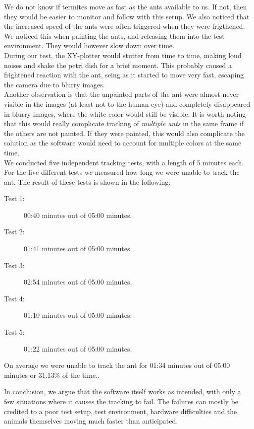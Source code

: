 We do not know if termites move as fast as the ants available to us. If not, then they would be easier to monitor and follow with this setup. We also noticed that the increased speed of the ants were often triggered when they were frigthened. We noticed this when painting the ants, and releasing them into the test environment. They would however slow down over time. \\

During our test, the XY-plotter would stutter from time to time, making loud noises and shake the petri dish for a brief moment. This probably caused a frightened reaction with the ant, seing as it started to move very fast, escaping the camera due to blurry images. \\

Another observation is that the unpainted parts of the ant were almost never visible in the images (at least not to the human eye) and completely disappeared in blurry images, where the white color would still be visible. It is worth noting that this would really complicate tracking of \emph{multiple ants} in the same frame if the others are not painted. If they were painted, this would also complicate the solution as the software would need to account for multiple colors at the same time.\\

We conducted five independent tracking tests, with a length of 5 minutes each. For the five different tests we measured how long we were unable to track the ant. The result of these tests is shown in the following:

\begin{description}
    \item[Test 1:] 00:40 minutes out of 05:00 minutes.
    \item[Test 2:] 01:41 minutes out of 05:00 minutes.
    \item[Test 3:] 02:54 minutes out of 05:00 minutes.
    \item[Test 4:] 01:10 minutes out of 05:00 minutes.
    \item[Test 5:] 01:22 minutes out of 05:00 minutes.
\end{description}

On average we were unable to track the ant for 01:34 minutes out of 05:00 minutes or 31.13\% of the time..

In conclusion, we argue that the software itself works as intended, with only a few situations where it causes the tracking to fail. The failures can mostly be credited to a poor test setup, test environment, hardware difficulties and the animals themselves moving much faster than anticipated.\\